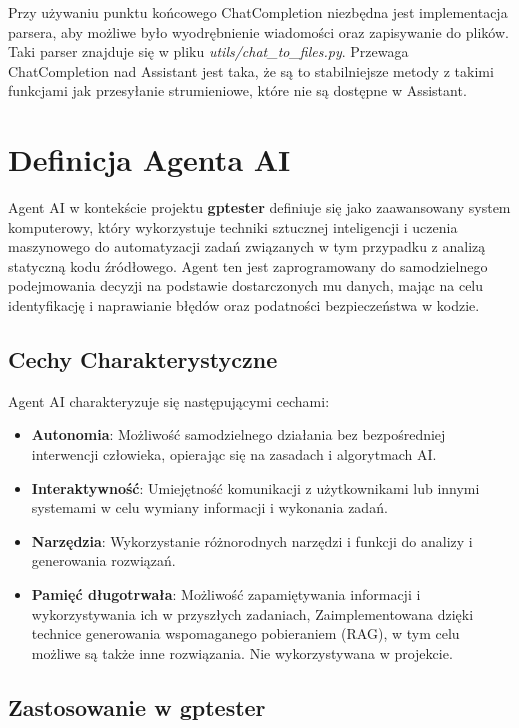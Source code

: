\restoregeometry

Przy używaniu punktu końcowego ChatCompletion niezbędna jest implementacja parsera, aby możliwe było wyodrębnienie wiadomości oraz zapisywanie do plików. Taki parser znajduje się w pliku \textit{utils/chat\_to\_files.py}. Przewaga ChatCompletion nad Assistant jest taka, że są to stabilniejsze metody z takimi funkcjami jak przesyłanie strumieniowe, które nie są dostępne w Assistant. 

\section{Definicja Agenta AI}
Agent AI w kontekście projektu \textbf{gptester} definiuje się jako zaawansowany system komputerowy, który wykorzystuje techniki sztucznej inteligencji i uczenia maszynowego do automatyzacji zadań związanych w tym przypadku z analizą statyczną kodu źródłowego. Agent ten jest zaprogramowany do samodzielnego podejmowania decyzji na podstawie dostarczonych mu danych, mając na celu identyfikację i naprawianie błędów oraz podatności bezpieczeństwa w kodzie.

\subsection{Cechy Charakterystyczne}

Agent AI charakteryzuje się następującymi cechami:

\begin{itemize}
    \item \textbf{Autonomia}: Możliwość samodzielnego działania bez bezpośredniej interwencji człowieka, opierając się na zasadach i algorytmach AI.
    \item \textbf{Interaktywność}: Umiejętność komunikacji z użytkownikami lub innymi systemami w celu wymiany informacji i wykonania zadań.
    \item \textbf{Narzędzia}: Wykorzystanie różnorodnych narzędzi i funkcji do analizy i generowania rozwiązań.
    \item \textbf{Pamięć długotrwała}: Możliwość zapamiętywania informacji i wykorzystywania ich w przyszłych zadaniach, Zaimplementowana dzięki technice generowania wspomaganego pobieraniem (RAG), w tym celu możliwe są także inne rozwiązania. Nie wykorzystywana w projekcie.
\end{itemize}

\subsection{Zastosowanie w \textbf{gptester}}

